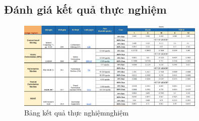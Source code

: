 \subsection{Đánh giá kết quả thực nghiệm}
\label{sec:ketqua}
\begin{figure}[h]
    \centering
    \includegraphics[width=0.8\textwidth]{figures/71.png}
    \caption{Bảng kết quả thực nghiệmnghiệm}
\end{figure}

